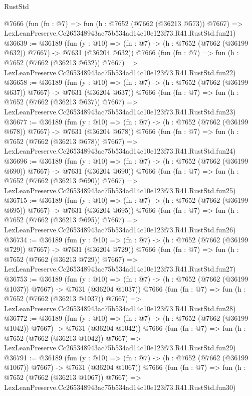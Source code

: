 \begin{lexlean}{RustStd}
\begin{coremodule}
    @7666
    (fun (fn : @7) =>
    fun (h : @7652 (@7662 (@36213 @573)) @7667) =>
    LexLeanPreserve.Cc265348943ac75b534ad14c10e123f73.R41.RustStd.fun21)
@36639 := @36189
    (fun (y : @10) => (fn : @7) -> (h : @7652 (@7662 (@36199 @632)) @7667) -> @7631 (@36204 @632))
    @7666
    (fun (fn : @7) =>
    fun (h : @7652 (@7662 (@36213 @632)) @7667) =>
    LexLeanPreserve.Cc265348943ac75b534ad14c10e123f73.R41.RustStd.fun22)
@36658 := @36189
    (fun (y : @10) => (fn : @7) -> (h : @7652 (@7662 (@36199 @637)) @7667) -> @7631 (@36204 @637))
    @7666
    (fun (fn : @7) =>
    fun (h : @7652 (@7662 (@36213 @637)) @7667) =>
    LexLeanPreserve.Cc265348943ac75b534ad14c10e123f73.R41.RustStd.fun23)
@36677 := @36189
    (fun (y : @10) => (fn : @7) -> (h : @7652 (@7662 (@36199 @678)) @7667) -> @7631 (@36204 @678))
    @7666
    (fun (fn : @7) =>
    fun (h : @7652 (@7662 (@36213 @678)) @7667) =>
    LexLeanPreserve.Cc265348943ac75b534ad14c10e123f73.R41.RustStd.fun24)
@36696 := @36189
    (fun (y : @10) => (fn : @7) -> (h : @7652 (@7662 (@36199 @690)) @7667) -> @7631 (@36204 @690))
    @7666
    (fun (fn : @7) =>
    fun (h : @7652 (@7662 (@36213 @690)) @7667) =>
    LexLeanPreserve.Cc265348943ac75b534ad14c10e123f73.R41.RustStd.fun25)
@36715 := @36189
    (fun (y : @10) => (fn : @7) -> (h : @7652 (@7662 (@36199 @695)) @7667) -> @7631 (@36204 @695))
    @7666
    (fun (fn : @7) =>
    fun (h : @7652 (@7662 (@36213 @695)) @7667) =>
    LexLeanPreserve.Cc265348943ac75b534ad14c10e123f73.R41.RustStd.fun26)
@36734 := @36189
    (fun (y : @10) => (fn : @7) -> (h : @7652 (@7662 (@36199 @729)) @7667) -> @7631 (@36204 @729))
    @7666
    (fun (fn : @7) =>
    fun (h : @7652 (@7662 (@36213 @729)) @7667) =>
    LexLeanPreserve.Cc265348943ac75b534ad14c10e123f73.R41.RustStd.fun27)
@36753 := @36189
    (fun (y : @10) => (fn : @7) -> (h : @7652 (@7662 (@36199 @1037)) @7667) -> @7631 (@36204 @1037))
    @7666
    (fun (fn : @7) =>
    fun (h : @7652 (@7662 (@36213 @1037)) @7667) =>
    LexLeanPreserve.Cc265348943ac75b534ad14c10e123f73.R41.RustStd.fun28)
@36772 := @36189
    (fun (y : @10) => (fn : @7) -> (h : @7652 (@7662 (@36199 @1042)) @7667) -> @7631 (@36204 @1042))
    @7666
    (fun (fn : @7) =>
    fun (h : @7652 (@7662 (@36213 @1042)) @7667) =>
    LexLeanPreserve.Cc265348943ac75b534ad14c10e123f73.R41.RustStd.fun29)
@36791 := @36189
    (fun (y : @10) => (fn : @7) -> (h : @7652 (@7662 (@36199 @1067)) @7667) -> @7631 (@36204 @1067))
    @7666
    (fun (fn : @7) =>
    fun (h : @7652 (@7662 (@36213 @1067)) @7667) =>
    LexLeanPreserve.Cc265348943ac75b534ad14c10e123f73.R41.RustStd.fun30)

\end{coremodule}
\end{lexlean}
